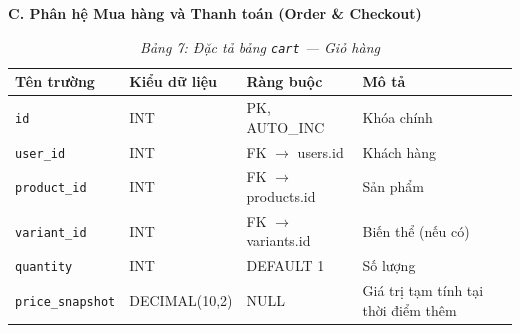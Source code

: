 \documentclass[11pt, a4paper]{article}
\begin{document}
\vspace{0.3cm}
\textbf{C. Phân hệ Mua hàng và Thanh toán (Order \& Checkout)}

\begin{table}[H]
    \centering
    \caption{\textit{Bảng 7: Đặc tả bảng \texttt{cart} --- Giỏ hàng}}
    \vspace{0.2cm}
    \begin{tabularx}{\linewidth}{|>{\raggedright\arraybackslash}p{3cm}|l|l|Y|}
        \hline
        \textbf{Tên trường} & \textbf{Kiểu dữ liệu} & \textbf{Ràng buộc} & \textbf{Mô tả} \\ \hline
        \texttt{id} & INT & PK, AUTO\_INC & Khóa chính \\ \hline
        \texttt{user\_id} & INT & FK $\rightarrow$ users.id & Khách hàng \\ \hline
        \texttt{product\_id} & INT & FK $\rightarrow$ products.id & Sản phẩm \\ \hline
        \texttt{variant\_id} & INT & FK $\rightarrow$ variants.id& Biến thể (nếu có) \\ \hline
        \texttt{quantity} & INT & DEFAULT 1 & Số lượng \\ \hline
        \texttt{price\_snapshot}& DECIMAL(10,2)& NULL & Giá trị tạm tính tại thời điểm thêm \\ \hline
    \end{tabularx}
\end{table}
\end{document}
